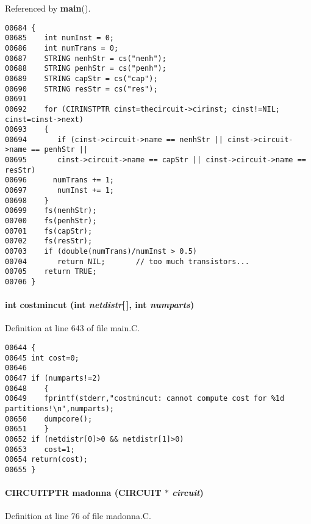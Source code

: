 Referenced by {\bf main}().\small\begin{verbatim}00684 {
00685    int numInst = 0;
00686    int numTrans = 0;
00687    STRING nenhStr = cs("nenh");
00688    STRING penhStr = cs("penh");
00689    STRING capStr = cs("cap");
00690    STRING resStr = cs("res");
00691 
00692    for (CIRINSTPTR cinst=thecircuit->cirinst; cinst!=NIL; cinst=cinst->next)
00693    {
00694       if (cinst->circuit->name == nenhStr || cinst->circuit->name == penhStr ||
00695       cinst->circuit->name == capStr || cinst->circuit->name == resStr)
00696      numTrans += 1;
00697       numInst += 1;
00698    }
00699    fs(nenhStr);
00700    fs(penhStr);
00701    fs(capStr);
00702    fs(resStr);
00703    if (double(numTrans)/numInst > 0.5)
00704       return NIL;       // too much transistors...
00705    return TRUE;  
00706 }
\end{verbatim}\normalsize 
\label{main.C_a16}
\paragraph{\setlength{\rightskip}{0pt plus 5cm}int costmincut (int {\em netdistr}[$\,$], int {\em numparts})}\hfill



Definition at line 643 of file main.C.\small\begin{verbatim}00644 {
00645 int cost=0;
00646 
00647 if (numparts!=2)
00648    {
00649    fprintf(stderr,"costmincut: cannot compute cost for %1d partitions!\n",numparts);
00650    dumpcore();
00651    }
00652 if (netdistr[0]>0 && netdistr[1]>0)
00653    cost=1;
00654 return(cost);
00655 }
\end{verbatim}\normalsize 
\label{main.C_a7}
\paragraph{\setlength{\rightskip}{0pt plus 5cm}CIRCUITPTR madonna (CIRCUIT $\ast$ {\em circuit})}\hfill



Definition at line 76 of file madonna.C.

